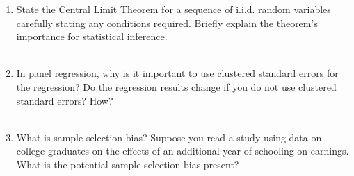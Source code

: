 \documentclass{article}
\begin{document}
\begin{enumerate}
    \item State the Central Limit Theorem for a sequence of i.i.d. random variables carefully stating any conditions required. Briefly explain the theorem's importance for statistical inference.\\[1em]
\\[1em]


    \item  In panel regression, why is it important to use clustered standard errors for the regression? Do the regression results change if you do not use clustered standard errors? How? \\[1em]
\\[1em]

    \item What is sample selection bias? Suppose you read a study using data on college graduates on the effects of an additional year of schooling on earnings. What is the potential sample selection bias present?\\[1em]
\end{enumerate}
\end{document}

